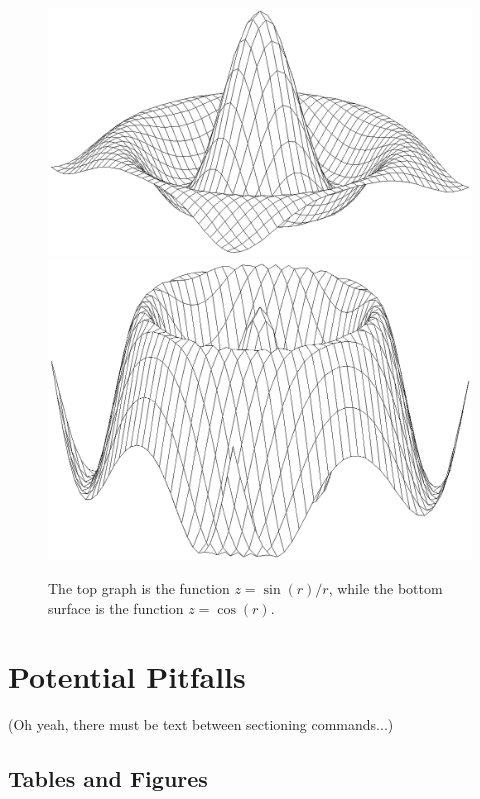 \begin{figure}[p]
  \centering
  \begin{minipage}{4.5in}
    \includegraphics[width=\linewidth]{Figures/somb.eps}
    \includegraphics[width=\linewidth]{Figures/cos.eps}
    \caption{The top graph is the function $z = \sin(r)/r$, while
      the bottom surface is the function $z = \cos(r)$. \label{fullfig}}
  \end{minipage}
\end{figure}



\section{Potential Pitfalls}

(Oh yeah, there must be text between sectioning commands...)

\subsection{Tables and Figures}

